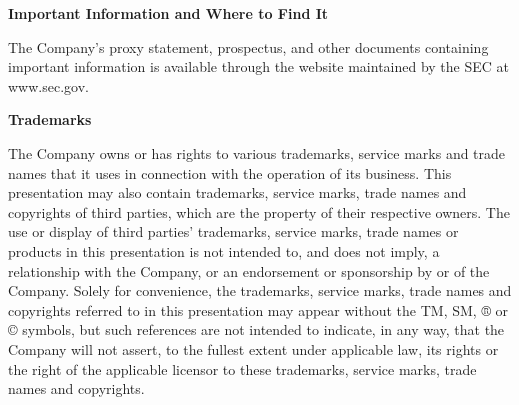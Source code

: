 \textbf{Important Information and Where to Find It}\par\nobreak
The Company's proxy statement, prospectus, and other documents containing important information is available through the website maintained by the SEC at www.sec.gov.\par
\bigskip

\textbf{Trademarks}\par\nobreak
The Company owns or has rights to various trademarks, service marks and trade names that it uses in connection with the operation of its business. This presentation may also contain trademarks, service marks, trade names and copyrights of third parties, which are the property of their respective owners. The use or display of third parties' trademarks, service marks, trade names or products in this presentation is not intended to, and does not imply, a relationship with the Company, or an endorsement or sponsorship by or of the Company. Solely for convenience, the trademarks, service marks, trade names and copyrights referred to in this presentation may appear without the TM, SM, ® or © symbols, but such references are not intended to indicate, in any way, that the Company will not assert, to the fullest extent under applicable law, its rights or the right of the applicable licensor to these trademarks, service marks, trade names and copyrights.\par
